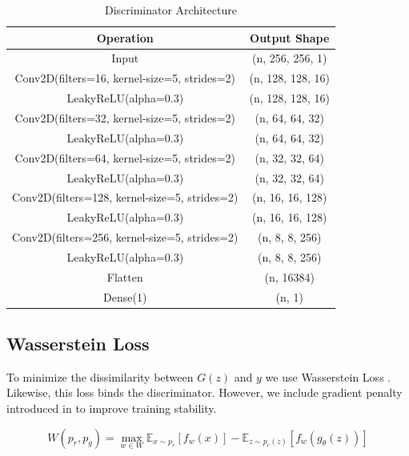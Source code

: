\begin{center}
    \begin{table}[H]
        \centering
        \begin{tabular}{c|c}
             Operation & Output Shape \\
             \hline
             Input & (n, 256, 256, 1)\\
             Conv2D(filters=16, kernel-size=5, strides=2) & (n, 128, 128, 16)\\
             LeakyReLU(alpha=0.3)         & (n, 128, 128, 16)\\
             Conv2D(filters=32, kernel-size=5, strides=2) & (n, 64, 64, 32)\\
             LeakyReLU(alpha=0.3)         & (n, 64, 64, 32)\\
             Conv2D(filters=64, kernel-size=5, strides=2) & (n, 32, 32, 64)\\
             LeakyReLU(alpha=0.3)         & (n, 32, 32, 64)\\
             Conv2D(filters=128, kernel-size=5, strides=2) & (n, 16, 16, 128)\\
             LeakyReLU(alpha=0.3)         & (n, 16, 16, 128)\\
             Conv2D(filters=256, kernel-size=5, strides=2) & (n, 8, 8, 256)\\
             LeakyReLU(alpha=0.3)         & (n, 8, 8, 256)\\
             Flatten           & (n, 16384)\\
             Dense(1)             & (n, 1)\\
        \end{tabular}
        \caption{Discriminator Architecture}
        \label{tab:disc}
    \end{table}
\end{center}

\subsection{Wasserstein Loss}
To minimize the dissimilarity between $G(z)$ and $y$ we use Wasserstein Loss \cite{WGAN}. Likewise, this loss binds the discriminator. However, we include gradient penalty introduced in \cite{WGAN-GP} to improve training stability.

\begin{equation}
\label{eq:wasserstein}
        W(p_r, p_g) = \max_{w \in W} \mathbb{E}_{x \sim p_r}[f_w(x)] - \mathbb{E}_{z \sim p_r(z)}[f_w(g_\theta(z))]
\end{equation}


